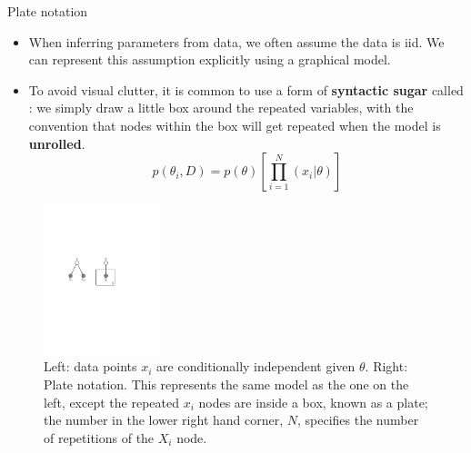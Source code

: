 \documentclass[10pt,mathserif]{beamer}
\begin{document}
\begin{frame}{Plate notation}
\begin{itemize}
    \item When inferring parameters from data, we often assume the data is iid. We can represent this assumption explicitly using a graphical model.
    \item To avoid visual clutter, it is common to use a form of \textbf{syntactic sugar} called \textbf{}: we simply draw a little box around the repeated variables, with the convention that nodes within the box will get repeated when the model is \textbf{unrolled}.
    \begin{equation}
        p(\theta_i,D) = p(\theta)[\prod_{i=1}^N(x_i|\theta)]
    \end{equation}
\end{itemize}

\begin{figure}[h]
\centering
\includegraphics[width=0.3\textwidth]{platesIIDx}
\caption{Left: data points $x_i$ are conditionally independent given $\theta$. Right: Plate notation. This represents the same model as the one on the left, except the repeated $x_i$ nodes are inside a box, known as a plate; the number in the lower right hand corner, $N$, specifies the number of repetitions of the $X_i$ node.}
\end{figure}
\end{frame}
\end{document}
